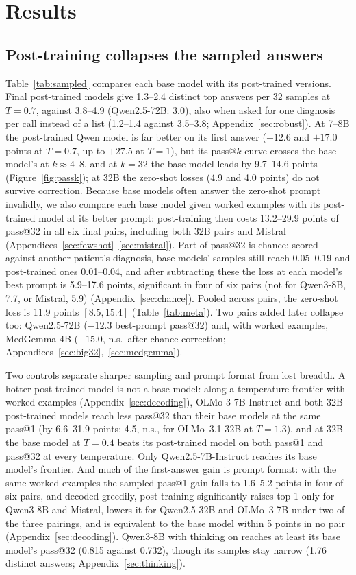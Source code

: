 \documentclass[wcp]{jmlr}
\begin{document}
\section{Results}
\subsection{Post-training collapses the sampled answers}\label{sec:sampled}
Table~\ref{tab:sampled} compares each base model with its post-trained versions. Final post-trained models give 1.3--2.4 distinct top answers per 32 samples at $T{=}0.7$, against 3.8--4.9 (Qwen2.5-72B: 3.0), also when asked for one diagnosis per call instead of a list (1.2--1.4 against 3.5--3.8; Appendix~\ref{sec:robust}). At 7--8B the post-trained Qwen model is far better on its first answer ($+12.6$ and $+17.0$ points at $T{=}0.7$, up to $+27.5$ at $T{=}1$), but its pass@$k$ curve crosses the base model's at $k{\approx}4$--8, and at $k{=}32$ the base model leads by 9.7--14.6 points (Figure~\ref{fig:passk}); at 32B the zero-shot losses (4.9 and 4.0 points) do not survive correction. Because base models often answer the zero-shot prompt invalidly, we also compare each base model given worked examples with its post-trained model at its better prompt: post-training then costs 13.2--29.9 points of pass@32 in all six final pairs, including both 32B pairs and Mistral (Appendices~\ref{sec:fewshot}--\ref{sec:mistral}). Part of pass@32 is chance: scored against another patient's diagnosis, base models' samples still reach 0.05--0.19 and post-trained ones 0.01--0.04, and after subtracting these the loss at each model's best prompt is 5.9--17.6 points, significant in four of six pairs (not for Qwen3-8B, 7.7, or Mistral, 5.9) (Appendix~\ref{sec:chance}). Pooled across pairs, the zero-shot loss is 11.9 points $[8.5,15.4]$ (Table~\ref{tab:meta}). Two pairs added later collapse too: Qwen2.5-72B ($-12.3$ best-prompt pass@32) and, with worked examples, MedGemma-4B ($-15.0$, n.s.\ after chance correction; Appendices~\ref{sec:big32},~\ref{sec:medgemma}).

Two controls separate sharper sampling and prompt format from lost breadth. A hotter post-trained model is not a base model: along a temperature frontier with worked examples (Appendix~\ref{sec:decoding}), OLMo-3-7B-Instruct and both 32B post-trained models reach less pass@32 than their base models at the same pass@1 (by 6.6--31.9 points; 4.5, n.s., for OLMo~3.1 32B at $T{=}1.3$), and at 32B the base model at $T{=}0.4$ beats its post-trained model on both pass@1 and pass@32 at every temperature. Only Qwen2.5-7B-Instruct reaches its base model's frontier. And much of the first-answer gain is prompt format: with the same worked examples the sampled pass@1 gain falls to 1.6--5.2 points in four of six pairs, and decoded greedily, post-training significantly raises top-1 only for Qwen3-8B and Mistral, lowers it for Qwen2.5-32B and OLMo~3 7B under two of the three pairings, and is equivalent to the base model within 5 points in no pair (Appendix~\ref{sec:decoding}). Qwen3-8B with thinking on reaches at least its base model's pass@32 (0.815 against 0.732), though its samples stay narrow (1.76 distinct answers; Appendix~\ref{sec:thinking}).
\end{document}
